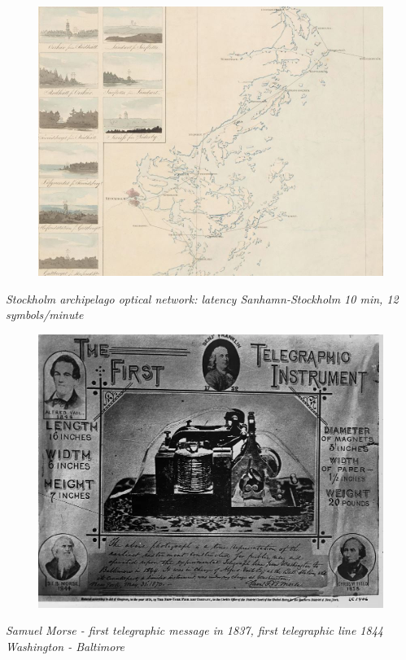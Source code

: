 \begin{frame}

  \begin{figure}
    \center
    \includegraphics[scale=0.4]{stockholm.jpg}
  \end{figure}

  \vspace{10pt}\pause
  {\em Stockholm archipelago optical network: latency Sanhamn-Stockholm 10 min, 12 symbols/minute}
  
\end{frame}


\begin{frame}

  \begin{figure}
    \center
    \includegraphics[scale=0.2]{morse.png}

  \end{figure}

  \vspace{10pt}\pause  
  {\em Samuel Morse - first telegraphic message in 1837, first telegraphic line 1844 Washington - Baltimore}
\end{frame}


